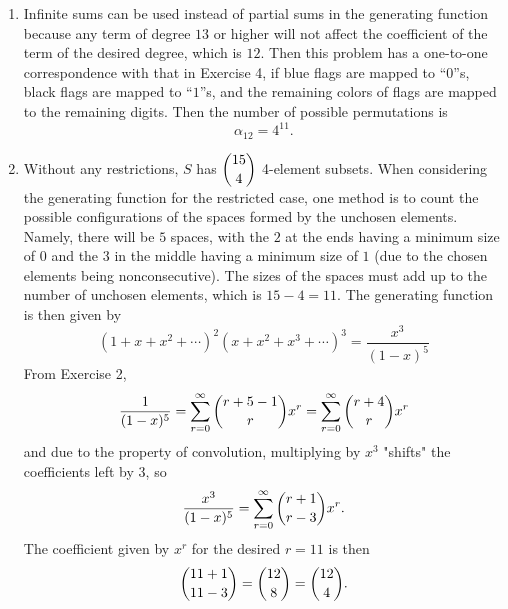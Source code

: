 \documentclass[a4paper, 12pt]{article}
\begin{document}
\begin{enumerate}
		\item Infinite sums can be used instead of partial sums in the generating function because any term of degree $13$ or higher will not affect the coefficient of the term of the desired degree, which is $12$. Then this problem has a one-to-one correspondence with that in Exercise 4, if blue flags are mapped to ``$0$''s, black flags are mapped to ``$1$''s, and the remaining colors of flags are mapped to the remaining digits. Then the number of possible permutations is
		\[ \alpha_{12} = 4^{11}. \]
		
		\item Without any restrictions, $S$ has $\dbinom{15}{4}$ 4-element subsets. When considering the generating function for the restricted case, one method is to count the possible configurations of the spaces formed by the unchosen elements. Namely, there will be $5$ spaces, with the $2$ at the ends having a minimum size of $0$ and the $3$ in the middle having a minimum size of $1$ (due to the chosen elements being nonconsecutive). The sizes of the spaces must add up to the number of unchosen elements, which is $15 - 4 = 11$. The generating function is then given by
		\[ (1 + x + x^2 + \cdots)^2(x + x^2 + x^3 + \cdots)^3 = \frac{x^3}{(1 - x)^5} \]
		From Exercise 2,
		\[ \frac{1}{(1 - x)^5} = \sum_{r = 0}^{\infty}{\dbinom{r + 5 - 1}{r}}x^r = \sum_{r = 0}^{\infty}{\dbinom{r + 4}{r}}x^r \]
		and due to the property of convolution, multiplying by $x^3$ "shifts" the coefficients left by $3$, so
		\[ \frac{x^3}{(1 - x)^5} = \sum_{r = 0}^{\infty}{\dbinom{r + 1}{r - 3}}x^r. \]
		The coefficient given by $x^r$ for the desired $r = 11$ is then
		\[ \dbinom{11 + 1}{11 - 3} = \dbinom{12}{8} = \dbinom{12}{4}. \]
		
	\end{enumerate}
\end{document}
